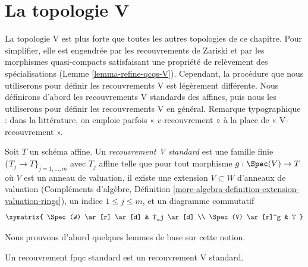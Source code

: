 \section{La topologie V}
\label{section-V}

\noindent
La topologie V est plus forte que toutes les autres topologies de ce chapitre. Pour simplifier, elle est engendrée par les recouvrements de Zariski et par les morphismes quasi-compacts satisfaisant une propriété de relèvement des spécialisations (Lemme \ref{lemma-refine-qcqs-V}). Cependant, la procédure que nous utiliserons pour définir les recouvrements V est légèrement différente. Nous définirons d'abord les recouvrements V standards des affines, puis nous les utiliserons pour définir les recouvrements V en général. Remarque typographique : dans la littérature, on emploie parfois « $v$-recouvrement » à la place de « V-recouvrement ».

\begin{definition}
\label{definition-standard-V-covering}
Soit $T$ un schéma affine. Un {\it recouvrement V standard} est une famille finie $\{T_j \to T\}_{j = 1, \ldots, m}$ avec $T_j$ affine telle que pour tout morphisme $g : \Spec(V) \to T$ où $V$ est un anneau de valuation, il existe une extension $V \subset W$ d'anneaux de valuation (Compléments d'algèbre, Définition \ref{more-algebra-definition-extension-valuation-rings}), un indice $1 \leq j \leq m$, et un diagramme commutatif
$$
\xymatrix{
\Spec(W) \ar[r] \ar[d] & T_j \ar[d] \\
\Spec(V) \ar[r]^g & T
}
$$
\end{definition}

\noindent
Nous prouvons d'abord quelques lemmes de base sur cette notion.

\begin{lemma}
\label{lemma-standard-fpqc-standard-V}
Un recouvrement fpqc standard est un recouvrement V standard.
\end{lemma}

